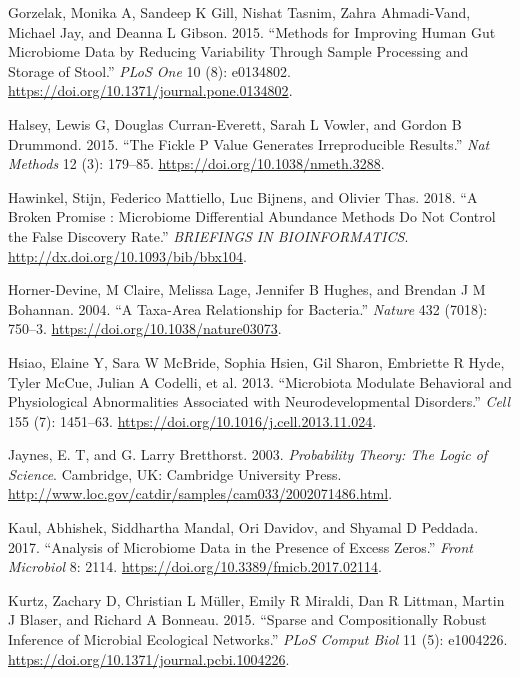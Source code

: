 \documentclass[onecolumn]{article}
\begin{document}
\leavevmode\hypertarget{ref-Gorzelak:2015aa}{}%
Gorzelak, Monika A, Sandeep K Gill, Nishat Tasnim, Zahra Ahmadi-Vand, Michael Jay, and Deanna L Gibson. 2015. ``Methods for Improving Human Gut Microbiome Data by Reducing Variability Through Sample Processing and Storage of Stool.'' \emph{PLoS One} 10 (8): e0134802. \url{https://doi.org/10.1371/journal.pone.0134802}.

\leavevmode\hypertarget{ref-Halsey:2015aa}{}%
Halsey, Lewis G, Douglas Curran-Everett, Sarah L Vowler, and Gordon B Drummond. 2015. ``The Fickle P Value Generates Irreproducible Results.'' \emph{Nat Methods} 12 (3): 179--85. \url{https://doi.org/10.1038/nmeth.3288}.

\leavevmode\hypertarget{ref-hawinkel2017}{}%
Hawinkel, Stijn, Federico Mattiello, Luc Bijnens, and Olivier Thas. 2018. ``A Broken Promise : Microbiome Differential Abundance Methods Do Not Control the False Discovery Rate.'' \emph{BRIEFINGS IN BIOINFORMATICS}. \url{http://dx.doi.org/10.1093/bib/bbx104}.

\leavevmode\hypertarget{ref-Horner-Devine:2004aa}{}%
Horner-Devine, M Claire, Melissa Lage, Jennifer B Hughes, and Brendan J M Bohannan. 2004. ``A Taxa-Area Relationship for Bacteria.'' \emph{Nature} 432 (7018): 750--3. \url{https://doi.org/10.1038/nature03073}.

\leavevmode\hypertarget{ref-Hsiao:2013}{}%
Hsiao, Elaine Y, Sara W McBride, Sophia Hsien, Gil Sharon, Embriette R Hyde, Tyler McCue, Julian A Codelli, et al. 2013. ``Microbiota Modulate Behavioral and Physiological Abnormalities Associated with Neurodevelopmental Disorders.'' \emph{Cell} 155 (7): 1451--63. \url{https://doi.org/10.1016/j.cell.2013.11.024}.

\leavevmode\hypertarget{ref-Jaynes:2003}{}%
Jaynes, E. T, and G. Larry Bretthorst. 2003. \emph{Probability Theory: The Logic of Science}. Cambridge, UK: Cambridge University Press. \url{http://www.loc.gov/catdir/samples/cam033/2002071486.html}.

\leavevmode\hypertarget{ref-Kaul:2017aa}{}%
Kaul, Abhishek, Siddhartha Mandal, Ori Davidov, and Shyamal D Peddada. 2017. ``Analysis of Microbiome Data in the Presence of Excess Zeros.'' \emph{Front Microbiol} 8: 2114. \url{https://doi.org/10.3389/fmicb.2017.02114}.

\leavevmode\hypertarget{ref-Kurtz:2015}{}%
Kurtz, Zachary D, Christian L Müller, Emily R Miraldi, Dan R Littman, Martin J Blaser, and Richard A Bonneau. 2015. ``Sparse and Compositionally Robust Inference of Microbial Ecological Networks.'' \emph{PLoS Comput Biol} 11 (5): e1004226. \url{https://doi.org/10.1371/journal.pcbi.1004226}.
\end{document}
